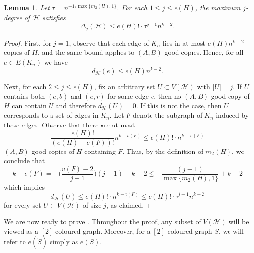 \documentclass[a4paper,reqno,11pt]{amsart}
\newtheorem{lemma}[theorem]{Lemma}
\theoremstyle{definition}
\theoremstyle{remark}
\newcommand\cH{\mathcal{H}}
\renewcommand\leq{\leqslant}
\renewcommand\le{\leqslant}
\begin{document}
\begin{lemma}\label{lem:degreecondition}
Let $\tau=n^{-1/\max\{m_2(H),1\}}$. For each $1\leq j\leq e(H)$, the maximum $j$-degree of $\cH$ satisfies
\[\Delta_j(\cH)\leq e(H)!\cdot\tau^{j-1} n^{k-2}. \]
\end{lemma}
\begin{proof}
First, for $j=1$, observe that each edge of $K_n$ lies in at most $e(H) n^{k-2}$ copies of $H$, 
and the same bound applies to $(A,B)$-good copies. Hence, for all $e \in E(K_n)$ we have
\[d_{\cH}(e) \leq e(H) n^{k-2}.\]

Next, for each $2\leq j\leq e(H)$, fix an arbitrary set $U\subset V(\cH)$ with $|U|=j$. 
If $U$ contains both $(e,b)$ and $(e,r)$ for some edge $e$, then no $(A,B)$-good copy of $H$ can contain $U$ and therefore $d_{\cH}(U)=0$. If this is not the case, then $U$ corresponds to a set of edges in $K_n$. 
Let $F$ denote the subgraph of $K_n$ induced by these edges. Observe that there are at most 
\[\frac{e(H)!}{(e(H)-e(F))!} n^{k-v(F)} \le e(H)!\cdot n^{k-v(F)}\] $(A,B)$-good copies of $H$ containing $F$. Thus, by the definition of $m_2(H)$, we conclude that
\[k-v(F)=-\bigg(\frac{v(F)-2}{j-1}\bigg)(j-1)+k-2\le-\frac{(j-1)}{\max\{m_2(H),1\}}+k-2\]
which implies
\begin{equation*}
    d_{\cH}(U) \leq e(H)!\cdot n^{k-v(F)} \leq e(H)!\cdot\tau^{j-1} n^{k-2}
\end{equation*}
for every set $U\subset V(\cH)$ of size $j$, as claimed.
\end{proof}

We are now ready to prove . Throughout the proof, any subset of $V(\cH)$ will be viewed as a $[2]$-coloured graph. Moreover, for a $[2]$-coloured graph $S$, we will refer to $e(\widetilde{S})$ simply as $e(S)$.
\end{document}
